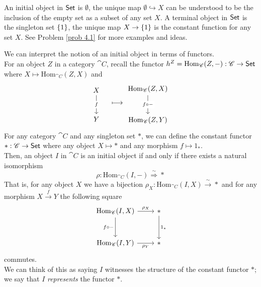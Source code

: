 \vspace*{0.1in}

\begin{example}
An initial object in $\mathsf{Set}$ is $\emptyset$, the unique map $\emptyset \hookrightarrow X$ can be understood to be the inclusion of the empty set as a subset of any set $X$. A terminal object in $\mathsf{Set}$ is the singleton set $\left\{1\right\}$, the unique map $X \to \left\{1\right\}$ is the constant function for any set $X$. See Problem \ref{prob 4.1} for more examples and ideas.
\end{example}

\vspace*{0.1in}

\begin{discussion}\label{initialrep}
We can interpret the notion of an initial object in terms of functors.\\[0.5em]
For an object $Z$ in a category $\cat{C}$, recall the functor $h^Z = \mathrm{Hom}_{\mathscr{C}}(Z,-):\mathscr{C} \to \mathsf{Set}$ where $X \mapsto \mathrm{Hom}_{\cat{C}}(Z,X)$ and
\[\begin{tikzcd}[row sep=large]
X \arrow[d, "f" description] \\
Y               
\end{tikzcd} \quad \longmapsto \begin{tikzcd}[row sep=large]
\mathrm{Hom}_{\cat{C}}(Z,X) \arrow[d, "f\circ-" description] \\
\mathrm{Hom}_{\cat{C}}(Z,Y)               
\end{tikzcd}\]
For any category $\cat{C}$ and any singleton set $*$, we can define the constant functor $*:\mathscr{C} \to \mathsf{Set}$ where any object $X \mapsto *$ and any morphism $f \mapsto 1_*$.\\[0.5em]
Then, an object $I$ in $\cat{C}$ is an initial object if and only if there exists a natural isomorphism
\[\rho:\mathrm{Hom}_{\cat{C}}(I,-) \overset{\sim}{\Longrightarrow} *\]
That is, for any object $X$ we have a bijection $\rho_X:\mathrm{Hom}_{\cat{C}}(I,X) \overset{\!\!\sim}{\to} *$ and for any morphism $X \overset{f}{\to} Y$ the following square
\[\begin{tikzcd}
{\mathrm{Hom}_{\cat{C}}(I,X)} \arrow[d, "f\circ-"'] \arrow[r, "\rho_X"] & * \arrow[d, "1_*"] \\[1em]
{\mathrm{Hom}_{\cat{C}}(I,Y)} \arrow[r, "\rho_Y"']                       & *                 
\end{tikzcd}\]
commutes.\\[0.5em]
We can think of this as saying $I$ witnesses the structure of the constant functor $*$; we say that $I$ \emph{represents} the functor $*$.
\end{discussion}

